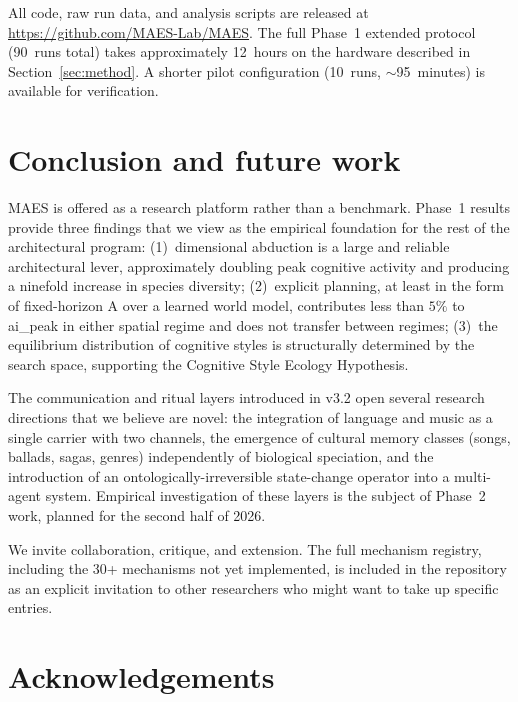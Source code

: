 \documentclass[11pt,a4paper]{article}
\begin{document}
All code, raw run data, and analysis scripts are released at
\url{https://github.com/MAES-Lab/MAES}. The full Phase~1 extended
protocol (90~runs total) takes approximately 12~hours on the hardware
described in Section~\ref{sec:method}. A shorter pilot configuration
(10~runs, $\sim$95~minutes) is available for verification.

\section{Conclusion and future work}
\label{sec:conclusion}

MAES is offered as a research platform rather than a benchmark.
Phase~1 results provide three findings that we view as the empirical
foundation for the rest of the architectural program: (1)~dimensional
abduction is a large and reliable architectural lever, approximately
doubling peak cognitive activity and producing a ninefold increase in
species diversity; (2)~explicit planning, at least in the form of
fixed-horizon A\* over a learned world model, contributes less than
$5\%$ to ai\_peak in either spatial regime and does not transfer between
regimes; (3)~the equilibrium distribution of cognitive styles is
structurally determined by the search space, supporting the Cognitive
Style Ecology Hypothesis.

The communication and ritual layers introduced in v3.2 open several research
directions that we believe are novel: the integration of language and
music as a single carrier with two channels, the emergence of cultural
memory classes (songs, ballads, sagas, genres) independently of
biological speciation, and the introduction of an
ontologically-irreversible state-change operator into a multi-agent
system. Empirical investigation of these layers is the subject of
Phase~2 work, planned for the second half of 2026.

We invite collaboration, critique, and extension. The full mechanism
registry, including the 30+ mechanisms not yet implemented, is included
in the repository as an explicit invitation to other researchers who
might want to take up specific entries.

\section*{Acknowledgements}
\end{document}

